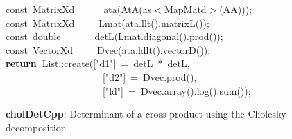 \documentclass[shortnames,article]{jss}
\newcommand{\hlstd}[1]{\textcolor[rgb]{0,0,0}{#1}}
\newcommand{\hlopt}[1]{\textcolor[rgb]{0,0,0}{#1}}
\newcommand{\hlstr}[1]{\textcolor[rgb]{0.90,0.15,0.15}{#1}}
\newcommand{\hlkwa}[1]{\textcolor[rgb]{0.61,0.13,0.93}{\bf{#1}}}
\newcommand{\hlkwb}[1]{\textcolor[rgb]{0.13,0.54,0.13}{#1}}
\newcommand{\hlkwd}[1]{\textcolor[rgb]{0,0,0}{#1}}
\begin{document}
\begin{figure}[htb]
    \noindent
    \ttfamily
    \hlstd{}\hlkwb{const\ }\hlstd{MatrixXd}\hlstd{\ \ \ \ \ \ }\hlstd{}\hlkwd{ata}\hlstd{}\hlopt{(}\hlstd{}\hlkwd{AtA}\hlstd{}\hlopt{(}\hlstd{as}\hlopt{$<$}\hlstd{MapMatd}\hlopt{$>$(}\hlstd{AA}\hlopt{)));}\hspace*{\fill}\\
    \hlstd{}\hlkwb{const\ }\hlstd{MatrixXd}\hlstd{\ \ \ \ \ }\hlstd{}\hlkwd{Lmat}\hlstd{}\hlopt{(}\hlstd{ata}\hlopt{.}\hlstd{}\hlkwd{llt}\hlstd{}\hlopt{().}\hlstd{}\hlkwd{matrixL}\hlstd{}\hlopt{());}\hspace*{\fill}\\
    \hlstd{}\hlkwb{const\ double}\hlstd{\ \ \ \ \ \ \ }\hlkwb{}\hlstd{}\hlkwd{detL}\hlstd{}\hlopt{(}\hlstd{Lmat}\hlopt{.}\hlstd{}\hlkwd{diagonal}\hlstd{}\hlopt{().}\hlstd{}\hlkwd{prod}\hlstd{}\hlopt{());}\hspace*{\fill}\\
    \hlstd{}\hlkwb{const\ }\hlstd{VectorXd}\hlstd{\ \ \ \ \ }\hlstd{}\hlkwd{Dvec}\hlstd{}\hlopt{(}\hlstd{ata}\hlopt{.}\hlstd{}\hlkwd{ldlt}\hlstd{}\hlopt{().}\hlstd{}\hlkwd{vectorD}\hlstd{}\hlopt{());}\hspace*{\fill}\\
    \hlstd{}\hlkwa{return\ }\hlstd{List}\hlopt{::}\hlstd{}\hlkwd{create}\hlstd{}\hlopt{(}\hlstd{\textunderscore }\hlopt{{[}}\hlstd{}\hlstr{"d1"}\hlstd{}\hlopt{{]}\ =\ }\hlstd{detL\ }\hlopt{{*}\ }\hlstd{detL}\hlopt{,}\hspace*{\fill}\\
    \hlstd{}\hlstd{\ \ \ \ \ \ \ \ \ \ \ \ \ \ \ \ \ \ \ \ }\hlstd{\textunderscore }\hlopt{{[}}\hlstd{}\hlstr{"d2"}\hlstd{}\hlopt{{]}\ =\ }\hlstd{Dvec}\hlopt{.}\hlstd{}\hlkwd{prod}\hlstd{}\hlopt{(),}\hspace*{\fill}\\
    \hlstd{}\hlstd{\ \ \ \ \ \ \ \ \ \ \ \ \ \ \ \ \ \ \ \ }\hlstd{\textunderscore }\hlopt{{[}}\hlstd{}\hlstr{"ld"}\hlstd{}\hlopt{{]}\ =\ }\hlstd{Dvec}\hlopt{.}\hlstd{}\hlkwd{array}\hlstd{}\hlopt{().}\hlstd{}\hlkwd{log}\hlstd{}\hlopt{().}\hlstd{}\hlkwd{sum}\hlstd{}\hlopt{());}\hlstd{}\hspace*{\fill}\\
    \mbox{}
    \normalfont
    \normalsize
  \caption{\textbf{cholDetCpp}: Determinant of a cross-product using the Cholesky decomposition}
  \label{cholDet}
\end{figure}
\end{document}
